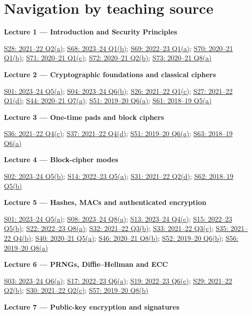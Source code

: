 \documentclass[11pt,a4paper]{article}
\begin{document}
\clearpage
\section{Navigation by teaching source}

\textbf{Lecture 1 — Introduction and Security Principles}


\hyperref[s28]{S28: 2021–22 Q2(a)}; \hyperref[s68]{S68: 2023–24 Q1(b)}; \hyperref[s69]{S69: 2022–23 Q1(a)}; \hyperref[s70]{S70: 2020–21 Q1(b)}; \hyperref[s71]{S71: 2020–21 Q1(c)}; \hyperref[s72]{S72: 2020–21 Q2(b)}; \hyperref[s73]{S73: 2020–21 Q8(a)}


\textbf{Lecture 2 — Cryptographic foundations and classical ciphers}


\hyperref[s01]{S01: 2023–24 Q5(a)}; \hyperref[s04]{S04: 2023–24 Q6(b)}; \hyperref[s26]{S26: 2021–22 Q1(c)}; \hyperref[s27]{S27: 2021–22 Q1(d)}; \hyperref[s44]{S44: 2020–21 Q7(a)}; \hyperref[s51]{S51: 2019–20 Q6(a)}; \hyperref[s61]{S61: 2018–19 Q5(a)}


\textbf{Lecture 3 — One-time pads and block ciphers}


\hyperref[s36]{S36: 2021–22 Q4(c)}; \hyperref[s37]{S37: 2021–22 Q4(d)}; \hyperref[s51]{S51: 2019–20 Q6(a)}; \hyperref[s63]{S63: 2018–19 Q6(a)}


\textbf{Lecture 4 — Block-cipher modes}


\hyperref[s02]{S02: 2023–24 Q5(b)}; \hyperref[s14]{S14: 2022–23 Q5(a)}; \hyperref[s31]{S31: 2021–22 Q2(d)}; \hyperref[s62]{S62: 2018–19 Q5(b)}


\textbf{Lecture 5 — Hashes,\allowbreak{} MACs and authenticated encryption}


\hyperref[s01]{S01: 2023–24 Q5(a)}; \hyperref[s08]{S08: 2023–24 Q8(a)}; \hyperref[s13]{S13: 2023–24 Q4(c)}; \hyperref[s15]{S15: 2022–23 Q5(b)}; \hyperref[s22]{S22: 2022–23 Q8(a)}; \hyperref[s32]{S32: 2021–22 Q3(b)}; \hyperref[s33]{S33: 2021–22 Q3(c)}; \hyperref[s35]{S35: 2021–22 Q4(b)}; \hyperref[s40]{S40: 2020–21 Q5(a)}; \hyperref[s46]{S46: 2020–21 Q8(b)}; \hyperref[s52]{S52: 2019–20 Q6(b)}; \hyperref[s56]{S56: 2019–20 Q8(a)}


\textbf{Lecture 6 — PRNGs,\allowbreak{} Diffie–Hellman and ECC}


\hyperref[s03]{S03: 2023–24 Q6(a)}; \hyperref[s17]{S17: 2022–23 Q6(a)}; \hyperref[s19]{S19: 2022–23 Q6(c)}; \hyperref[s29]{S29: 2021–22 Q2(b)}; \hyperref[s30]{S30: 2021–22 Q2(c)}; \hyperref[s57]{S57: 2019–20 Q8(b)}


\textbf{Lecture 7 — Public-key encryption and signatures}
\end{document}
